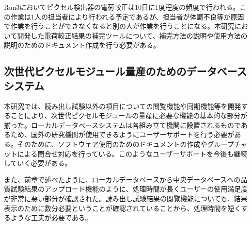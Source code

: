 Run3においてピクセル検出器の電荷較正は10日に1度程度の頻度で行われる。この作業は1人の担当者により行われる予定であるが、担当者が体調不良等が原因で作業を行うことができなくなると別の人が作業を行うことになる。本研究において開発した電荷較正結果の補完ツールについて、補完方法の説明や使用方法の説明のためのドキュメント作成を行う必要がある。



\subsection{次世代ピクセルモジュール量産のためのデータベースシステム}
\label{sec:dbnokonngonokadai}

本研究では、読み出し試験以外の項目についての閲覧機能や同期機能等を開発することにより、次世代ピクセルモジュールの量産に必要な機能の基本的な部分が揃った。ローカルデータベースシステムは各組み立て機関に設置されるものであるため、国外の研究機関が使用できるようにユーザーサポートを行う必要がある。そのために、ソフトウェア使用のためのドキュメントの作成やグループチャットによる問合せ対応を行っている。このようなユーザーサポートを今後も継続していく必要がある。

また、前章で述べたように、ローカルデータベースから中央データベースへの品質試験結果のアップロード機能のように、処理時間が長くユーザーの使用満足度が非常に悪い部分が確認された。読み出し試験結果の閲覧機能についても、結果表示のために数分必要ということが確認されていることから、処理時間を短くするような工夫が必要である。

\newpage
